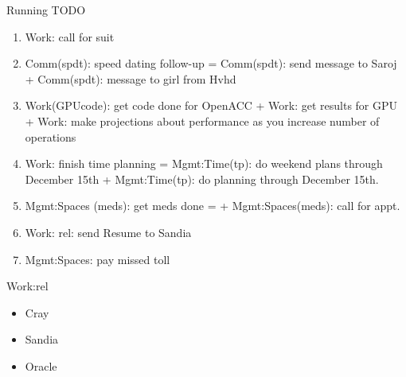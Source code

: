 \begin{frame}
\begin{columns}
\begin{column}{0.50\linewidth}
\begin{block}{Running TODO}
\begin{enumerate}



        \item \tiny Work: call for suit  

        \item \tiny Comm(spdt): speed dating follow-up  =
          Comm(spdt): send message to Saroj + Comm(spdt): message to
          girl from Hvhd 

        \item \tiny Work(GPUcode): get code done for OpenACC +
          Work: get results for GPU + Work: make projections about
          performance as you          increase number of operations 


        \item \tiny Work: finish time planning = Mgmt:Time(tp): do
          weekend plans through December 15th  + Mgmt:Time(tp): do
          planning through December 15th. 


        \item \tiny Mgmt:Spaces (meds): get meds done =
           +
          Mgmt:Spaces(meds): call for appt. 

        \item \tiny Work: rel: send Resume to Sandia  

        \item \tiny Mgmt:Spaces: pay missed toll  

        \end{enumerate}        
      \end{block} 

\begin{block}{Work:rel}
\begin{itemize}

\tiny \item \tiny Cray  
\tiny \item \tiny Sandia 

\item \tiny Oracle 


\end{itemize}
\end{block}
\end{column}
\end{columns}
\end{frame}
